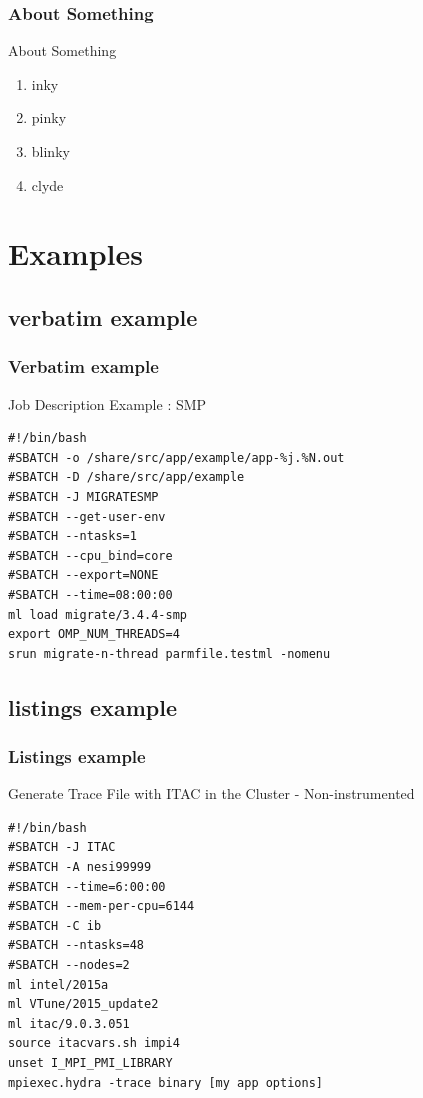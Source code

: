 \documentclass[aspectratio=169]{beamer}
\begin{document}
\begin{frame}[t]
  \frametitle{About Something}
    \begin{block}{About Something}
      \begin{enumerate}%
	  \item inky
	  \item pinky
	  \item blinky
	  \item clyde
    \end{enumerate}
  \end{block}
\end{frame}

\section{Examples}
\subsection{verbatim example}
\begin{frame}[fragile]
  \frametitle{Verbatim example}
    \begin{block}{Job Description Example : SMP}
      \begin{small}
        \begin{verbatim}
#!/bin/bash
#SBATCH -o /share/src/app/example/app-%j.%N.out
#SBATCH -D /share/src/app/example
#SBATCH -J MIGRATESMP
#SBATCH --get-user-env
#SBATCH --ntasks=1
#SBATCH --cpu_bind=core
#SBATCH --export=NONE
#SBATCH --time=08:00:00
ml load migrate/3.4.4-smp
export OMP_NUM_THREADS=4
srun migrate-n-thread parmfile.testml -nomenu
      \end{verbatim}
    \end{small}
  \end{block}
\end{frame}

\subsection{listings example}
\begin{frame}[fragile]
  \frametitle{Listings example}
  \begin{block}{Generate Trace File with ITAC in the Cluster - Non-instrumented}
    \begin{footnotesize}
      \lstset{language=bash,escapechar=@,style=customcode}
      \begin{lstlisting}
#!/bin/bash
#SBATCH -J ITAC
#SBATCH -A nesi99999
#SBATCH --time=6:00:00
#SBATCH --mem-per-cpu=6144
#SBATCH -C ib
#SBATCH --ntasks=48
#SBATCH --nodes=2
ml intel/2015a
ml VTune/2015_update2
ml itac/9.0.3.051
source itacvars.sh impi4
unset I_MPI_PMI_LIBRARY
mpiexec.hydra -trace binary [my app options]
      \end{lstlisting}
    \end{footnotesize}
  \end{block}
\end{frame}
\end{document}
